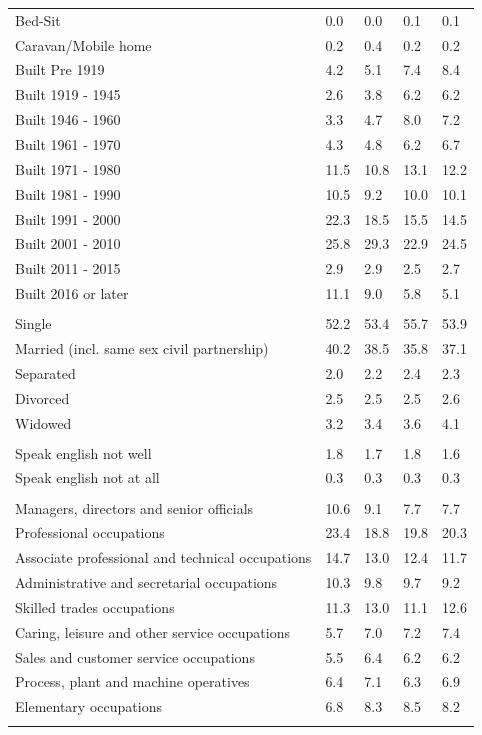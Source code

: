 \documentclass{article}
\begin{document}
\begin{table}[h]
\begin{tabular}{KTTTT}
Bed-Sit & 0.0& 0.0& 0.1& 0.1\\
Caravan/Mobile home & 0.2& 0.4& 0.2& 0.2\\
    \hline
Built Pre 1919 & 4.2& 5.1& 7.4& 8.4\\
Built 1919 - 1945 & 2.6& 3.8& 6.2& 6.2\\
Built  1946 - 1960 & 3.3& 4.7& 8.0& 7.2\\
Built  1961 - 1970 & 4.3& 4.8& 6.2& 6.7\\
Built  1971 - 1980 & 11.5& 10.8& 13.1& 12.2\\
Built  1981 - 1990 & 10.5&  9.2& 10.0& 10.1\\
Built  1991 - 2000 & 22.3& 18.5& 15.5& 14.5\\
Built  2001 - 2010 & 25.8& 29.3& 22.9& 24.5\\
Built  2011 - 2015 & 2.9& 2.9& 2.5& 2.7\\
Built  2016 or later & 11.1&  9.0&  5.8&  5.1\\
\hline
    \\
    \hline
Single & 52.2& 53.4& 55.7& 53.9\\
Married (incl. same sex civil partnership) & 40.2& 38.5& 35.8& 37.1\\
Separated  & 2.0& 2.2& 2.4& 2.3\\
Divorced  & 2.5& 2.5& 2.5& 2.6\\
Widowed & 3.2& 3.4& 3.6& 4.1\\
\hline
    \\ 
    \hline
Speak english not well & 1.8& 1.7& 1.8& 1.6\\
Speak english not at all & 0.3& 0.3& 0.3& 0.3\\
\hline
    \\
    \hline
Managers, directors and senior officials & 10.6&  9.1&  7.7&  7.7\\
Professional occupations & 23.4& 18.8& 19.8& 20.3\\
Associate professional and technical occupations & 14.7& 13.0& 12.4& 11.7\\
Administrative and secretarial occupations & 10.3&  9.8&  9.7&  9.2\\
Skilled trades occupations & 11.3& 13.0& 11.1& 12.6\\
Caring, leisure and other service occupations & 5.7& 7.0& 7.2& 7.4\\
Sales and customer service occupations & 5.5& 6.4& 6.2& 6.2\\
Process, plant and machine operatives & 6.4& 7.1& 6.3& 6.9\\
Elementary occupations & 6.8& 8.3& 8.5& 8.2\\
\hline
\end{tabular}
\end{table}
\end{document}
